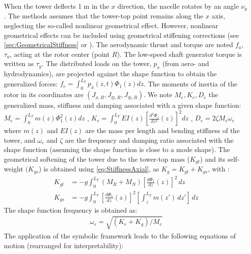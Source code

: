 \documentclass[wes, manuscript]{copernicus}
\begin{document}
When the tower deflects 1 \unit{m} in the $x$ direction, the nacelle rotates by an angle $\nu_y$.
The methods assumes that the tower-top point remains along the $x$ axis, neglecting the so-called nonlinear geometrical effect.
However, nonlinear geometrical effects can be included using geometrical stiffening corrections (see  \autoref{sec:GeometricalStiffness} or \cite{branlard:2019flex}).
The aerodynamic thrust and torque are noted $f_a$, $\tau_a$, acting at the rotor center (point $R$).
The low-speed shaft generator torque is written as $\tau_g$.
The distributed loads on the tower, $p_x$ (from aero- and hydrodynamics), are projected against the shape function to obtain the generalized forces: 
  $f_e=\int_0^{L_T} p_x(z,t)\Phi_1(z) dz $.
The moments of inertia of the rotor in its coordinates are $(J_{x,R}, J_{\oplus,R}, J_{\oplus,R})$.
    We note $M_e, K_e, D_e$  the generalized mass, stiffness and damping associated with a given shape function:
$M_e=\int_0^{L_T} m(z) \Phi_1^2(z) dz$
    ,
  $K_e=\int_0^{L_T} EI(z) \left[\frac{d^2\Phi_1}{dz^2}(z)\right]^2 dz$
,
    $D_e= 2 \zeta M_e \omega_e$
where $m(z)$ and $EI(z)$ are the mass per length and bending stiffness of the tower, and $\omega_e$  and $\zeta$ are the frequency and damping ratio associated with the shape function (assuming the shape function is close to a mode shape).
The geometrical softening of the tower due to the tower-top mass ($K_{gt}$) and its self-weight $(K_{gs}$) is obtained using \autoref{eq:StiffnessAxial}, as $K_g= K_{gt}+K_{gs}$, with :
\begin{align}
  K_{gt}&=- g \int_0^{L_T} (M_{R}+M_N)\left[\frac{d\Phi_1}{dz}(z)\right]^2\, dz
     \\
  K_{gs}&=- g \int_0^{L_T} \left[\frac{d\Phi_1}{dz}(z)\right]^2 \left[\int_z^{L_T} m(z')\,dz' \right]  \, dz
\end{align}
The shape function frequency is obtained as:
\begin{align}
    \omega_e = \sqrt{(K_e+K_g)/M_e}
\end{align}
The application of the symbolic framework leads to the following equations of motion (rearranged for interpretability):
\end{document}
